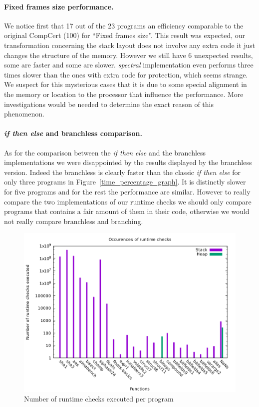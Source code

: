 \documentclass[11pt]{sdm}
\begin{document}
\paragraph{Fixed frames size performance.}
\label{par:Fixed frames size}
We notice first that 17 out of the 23 programs an efficiency comparable to the original CompCert (100) for ``Fixed frames size''. This result was expected, our transformation concerning the stack layout does not involve any extra code it just changes the structure of the memory. However we still have 6 unexpected results, some are faster and some are slower. \textit{spectral} implementation even performs three times slower than the ones with extra code for protection, which seems strange. We suspect for this mysterious cases that it is due to some special alignment in the memory or location to the processor that influence the performance. More investigations would be needed to determine the exact reason of this phenomenon.

\paragraph{\textit{if then else} and branchless comparison.}
\label{par:ifthenelsevsbranchless}
As for the comparison between the \textit{if then else} and the branchless implementations we were disappointed by the results displayed by the branchless version. Indeed the branchless is clearly faster than the classic \textit{if then else} for only three programs in Figure~\ref{time_percentage_graph}. It is distinctly slower for five programs and for the rest the performance are similar. However to really compare the two implementations of our runtime checks we should only compare programs that contains a fair amount of them in their code, otherwise we would not really compare branchless and branching.

\begin{figure}[!ht]
\centering
\includegraphics[width=1\textwidth]{images/occurence_graph.pdf}
\caption{Number of runtime checks executed per program}
\label{occurence_graph}
\end{figure}
\end{document}
